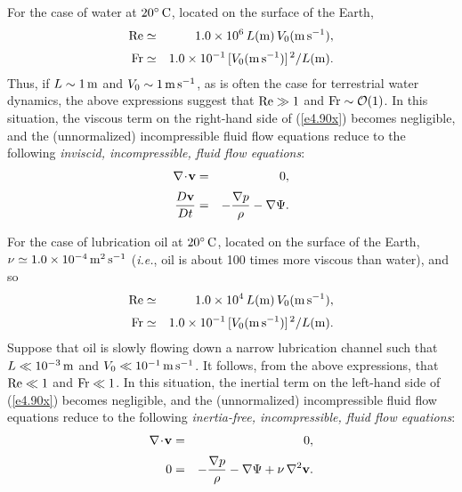For the case of water at $20^\circ\,{\rm C}$, located on the surface of the Earth, 
\begin{eqnarray}
{\rm Re} &\simeq& 1.0\times 10^6\,L({\rm m})\,V_0({\rm m\,s^{-1}}),\\[0.5ex]
{\rm Fr} &\simeq& 1.0\times 10^{-1}\,[V_0({\rm m\,s^{-1}})]^{\,2}/L({\rm m}).
\end{eqnarray}
Thus, if $L\sim 1\,{\rm m}$ and $V_0\sim 1\,{\rm m\,s^{-1}}$, as is often the
case for terrestrial water dynamics, the above expressions suggest that
 ${\rm Re}\gg 1$ and ${\rm Fr}\sim{\cal O}(1)$. 
In this situation, the viscous  term on the right-hand side of (\ref{e4.90x}) becomes negligible, 
and the (unnormalized) incompressible fluid flow equations
reduce to the following {\em inviscid, incompressible, fluid flow equations}:
\begin{eqnarray}
\nabla\!\cdot\!{\bf v} &=& 0,\\[0.5ex]
\frac{D{\bf v}}{Dt}&=& - \frac{\nabla p}{\rho} - \nabla\Psi.
\end{eqnarray}

For the case of lubrication oil at $20^\circ\,{\rm C}$, located on the surface of the Earth, $\nu\simeq 1.0\times 10^{-4}\,{\rm m^2\,s^{-1}}$ ({\em i.e.},
oil is about 100 times more viscous than water), and
so
\begin{eqnarray}
{\rm Re} &\simeq& 1.0\times 10^4\,L({\rm m})\,V_0({\rm m\,s^{-1}}),\\[0.5ex]
{\rm Fr} &\simeq& 1.0\times 10^{-1}\,[V_0({\rm m\,s^{-1}})]^{\,2}/L({\rm m}).
\end{eqnarray}
Suppose that oil is slowly flowing down a narrow lubrication channel such that $L\ll 10^{-3}\,{\rm m}$ and $V_0\ll 10^{-1}\,{\rm m\,s^{-1}}$.
It follows, from the above expressions, that ${\rm Re}\ll 1$ and ${\rm Fr}\ll 1$. In this situation, the inertial term on the left-hand
side of (\ref{e4.90x}) becomes negligible, and the (unnormalized)
 incompressible fluid flow equations
reduce to the following {\em inertia-free, incompressible, fluid flow equations}:
\begin{eqnarray}
\nabla\!\cdot\!{\bf v} &=& 0,\\[0.5ex]
0&=& - \frac{\nabla p}{\rho} - \nabla\Psi+\nu\,\nabla^2{\bf v}.
\end{eqnarray}

